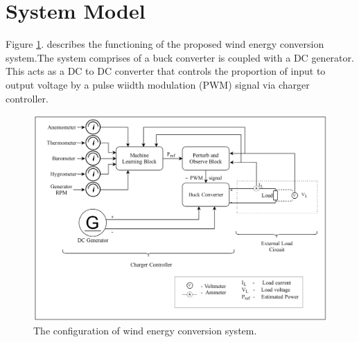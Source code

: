 \section{System Model}
\label{sec:1}
Figure \ref{Figure:2}. describes the functioning of the proposed wind energy conversion system.The system comprises of a buck converter is coupled with a DC generator. This acts as a DC to DC converter that controls the proportion of input to output voltage by a pulse wiidth modulation (PWM) signal via charger controller.
\begin{center}
\begin{figure}
 \includegraphics[width=12cm,keepaspectratio]{2.png}
\caption{The configuration of wind energy conversion system.}
\label{Figure:2}    
\end{figure}
\end{center}
